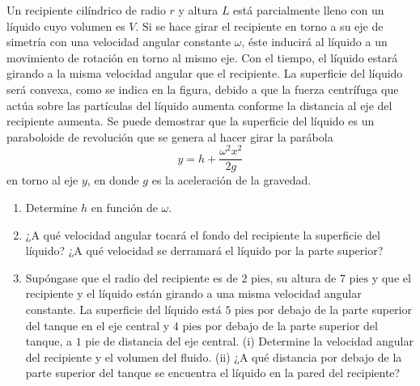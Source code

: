 \item Un recipiente cilíndrico de radio $r$ y altura $L$ está parcialmente lleno con un líquido cuyo volumen es $V$. Si se hace girar el recipiente en torno a su eje de simetría con una velocidad angular constante $\omega$, éste inducirá al líquido a un movimiento de rotación en torno al mismo eje. Con el tiempo, el líquido estará girando a la misma velocidad angular que el recipiente. La superficie del líquido será convexa, como se indica en la figura, debido a que la fuerza centrífuga que actúa sobre las partículas del líquido aumenta conforme la distancia al eje del recipiente aumenta. Se puede demostrar que la superficie del líquido es un paraboloide de revolución que se genera al hacer girar la parábola
    $$y = h + \frac{\omega^2 x^2}{2g}$$
    en torno al eje $y$, en donde $g$ es la aceleración de la gravedad.
\begin{enumerate}
    \item[(a)] Determine $h$ en función de $\omega$.
    \item[(b)] ¿A qué velocidad angular tocará el fondo del recipiente la superficie del líquido? ¿A qué velocidad se derramará el líquido por la parte superior?
    \item[(c)] Supóngase que el radio del recipiente es de $2 \text{ pies}$, su altura de $7 \text{ pies}$ y que el recipiente y el líquido están girando a una misma velocidad angular constante. La superficie del líquido está $5 \text{ pies}$ por debajo de la parte superior del tanque en el eje central y $4 \text{ pies}$ por debajo de la parte superior del tanque, a $1 \text{ pie}$ de distancia del eje central.
    (i) Determine la velocidad angular del recipiente y el volumen del fluido.
    (ii) ¿A qué distancia por debajo de la parte superior del tanque se encuentra el líquido en la pared del recipiente?
\end{enumerate}
\begin{center}
\end{center}
